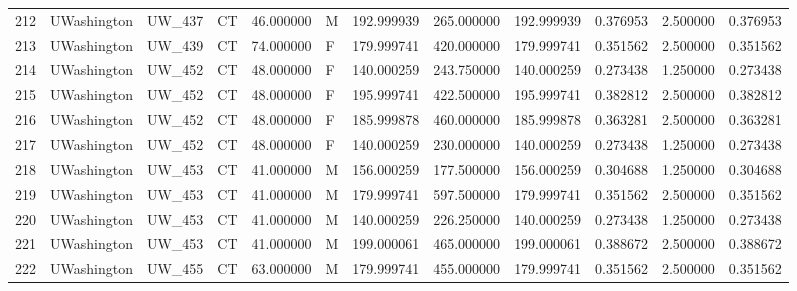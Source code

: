 \begin{tabular}{llllrlrrrrrr}
212    &     UWashington &       UW\_437 &                 CT &  46.000000 &        M &       192.999939 &    265.000000 &  192.999939 &               0.376953 &            2.500000 &          0.376953 \\
213    &     UWashington &       UW\_439 &                 CT &  74.000000 &        F &       179.999741 &    420.000000 &  179.999741 &               0.351562 &            2.500000 &          0.351562 \\
214    &     UWashington &       UW\_452 &                 CT &  48.000000 &        F &       140.000259 &    243.750000 &  140.000259 &               0.273438 &            1.250000 &          0.273438 \\
215    &     UWashington &       UW\_452 &                 CT &  48.000000 &        F &       195.999741 &    422.500000 &  195.999741 &               0.382812 &            2.500000 &          0.382812 \\
216    &     UWashington &       UW\_452 &                 CT &  48.000000 &        F &       185.999878 &    460.000000 &  185.999878 &               0.363281 &            2.500000 &          0.363281 \\
217    &     UWashington &       UW\_452 &                 CT &  48.000000 &        F &       140.000259 &    230.000000 &  140.000259 &               0.273438 &            1.250000 &          0.273438 \\
218    &     UWashington &       UW\_453 &                 CT &  41.000000 &        M &       156.000259 &    177.500000 &  156.000259 &               0.304688 &            1.250000 &          0.304688 \\
219    &     UWashington &       UW\_453 &                 CT &  41.000000 &        M &       179.999741 &    597.500000 &  179.999741 &               0.351562 &            2.500000 &          0.351562 \\
220    &     UWashington &       UW\_453 &                 CT &  41.000000 &        M &       140.000259 &    226.250000 &  140.000259 &               0.273438 &            1.250000 &          0.273438 \\
221    &     UWashington &       UW\_453 &                 CT &  41.000000 &        M &       199.000061 &    465.000000 &  199.000061 &               0.388672 &            2.500000 &          0.388672 \\
222    &     UWashington &       UW\_455 &                 CT &  63.000000 &        M &       179.999741 &    455.000000 &  179.999741 &               0.351562 &            2.500000 &          0.351562 \\

\end{tabular}
